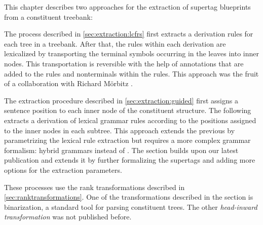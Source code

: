 \documentclass[../document.tex]{subfiles}
\begin{document}
    This chapter describes two approaches for the extraction of supertag blueprints from a constituent treebank:
    \begin{compactenum}
        \item
            The process described in \cref{sec:extraction:lcfrs} first extracts a derivation  rules for each tree in a treebank.
            After that, the rules within each derivation are lexicalized by transporting the terminal symbols occurring in the leaves into inner nodes.
            This transportation is reversible with the help of annotations that are added to the rules and nonterminals within the rules.
            This approach was the fruit of a collaboration with Richard Mörbitz \citep{MoeRup20,RupMoe21}.
        \item
            The extraction procedure described in \cref{sec:extraction:guided} first assigns a sentence position to each inner node of the constituent structure.
            The following extracts a derivation of lexical grammar rules according to the positions assigned to the inner nodes in each subtree.
            This approach extends the previous by parametrizing the lexical rule extraction but requires a more complex grammar formalism: hybrid grammars instead of .
            The section builds upon our latest publication \citep{Rup22} and extends it by further formalizing the supertags and adding more options for the extraction parameters.
    \end{compactenum}
    These processes use the rank transformations described in \cref{sec:ranktransformations}.
    One of the transformations described in the section is binarization, a standard tool for parsing constituent trees.
    The other \emph{head-inward transformation} was not published before.


    
    
    

\end{document}
